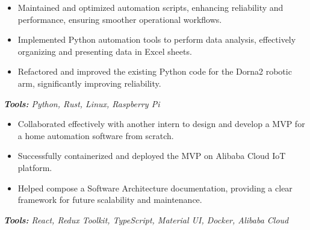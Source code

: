 \documentclass[10pt,letter]{altacv}
\begin{document}

\begin{fullwidth}
\makecvheader
\end{fullwidth}


\medskip


\begin{itemize}
  \item Maintained and optimized automation scripts, enhancing reliability and performance, ensuring smoother operational workflows.
  \item Implemented Python automation tools to perform data analysis, effectively organizing and presenting data in Excel sheets.
  \item Refactored and improved the existing Python code for the Dorna2 robotic arm, significantly improving reliability.
\end{itemize}
\textit{\textbf{Tools:} Python, Rust, Linux, Raspberry Pi}

\divider

\begin{itemize}
  \item Collaborated effectively with another intern to design and develop a MVP for a home automation software from scratch.
  \item Successfully containerized and deployed the MVP on Alibaba Cloud IoT platform.
  \item Helped compose a Software Architecture documentation, providing a clear framework for future scalability and maintenance.
\end{itemize}
\textit{\textbf{Tools:} React, Redux Toolkit, TypeScript, Material UI, Docker, Alibaba Cloud}
\end{document}
